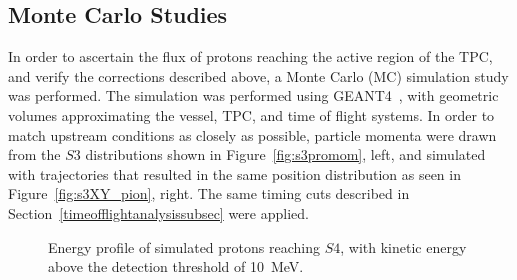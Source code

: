 \subsection{Monte Carlo Studies}
In order to ascertain the flux of protons reaching the active region of the TPC, and verify the corrections described above, a Monte Carlo (MC) simulation study was performed.
The simulation was performed using GEANT4~\cite{brun1993geant}, with geometric volumes approximating the vessel, TPC, and time of flight systems.
In order to match upstream conditions as closely as possible, particle momenta were drawn from the $\mathit{S3}$ distributions shown in Figure~\ref{fig:s3promom}, left, and simulated with trajectories that resulted in the same position distribution as seen in Figure~\ref{fig:s3XY_pion}, right.
The same timing cuts described in Section~\ref{timeofflightanalysissubsec} were applied.

%      

\begin{figure}[ht]
  \centering
     \begin{adjustbox}{max totalsize={\textwidth}{.35\textheight}, center}
      
    \end{adjustbox}
    \caption{Energy profile of simulated protons reaching $\mathit{S4}$, with kinetic energy above the detection threshold of 10~MeV.}
    \label{fig:MCS4}
\end{figure}

